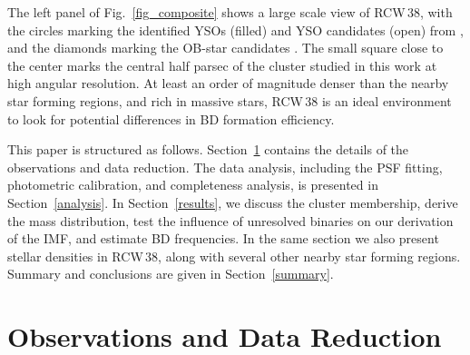 \documentclass[a4paper,fleqn,usenatbib]{mnras}
\begin{document}
 
The left panel of Fig.~\ref{fig_composite} shows a large scale view of RCW\,38, with the circles marking the identified YSOs (filled) 
and YSO candidates (open) from \citet{winston11}, and the diamonds marking the OB-star candidates \citep{wolk06, winston11}. The small
square close to the center marks the central half parsec of the cluster studied in this work at high angular resolution. 
At least an order of magnitude denser than the nearby star forming regions, and rich in massive stars, 
RCW\,38 is an ideal environment to look for potential differences in BD formation efficiency.

This paper is structured as follows. Section~\ref{Obs&DR} contains the details of the observations and data reduction.
The data analysis, including the PSF fitting, photometric calibration, and completeness analysis, is presented in Section~\ref{analysis}. 
In Section~\ref{results}, we discuss the cluster membership, derive the mass distribution, 
test the influence of unresolved binaries on our derivation of the IMF, 
and estimate BD frequencies. In the same section we also present stellar densities in RCW\,38, along with several other nearby star forming regions.
Summary and conclusions are given in Section~\ref{summary}.

\begin{figure*}
\centering
{}
\caption{{\bf Left:} Large scale view of RCW\,38. Circles mark the identified YSOs (filled) and YSO candidates (open) 
from \citet{winston11}, and the diamonds mark OB star candidates \citep{wolk06, winston11}. The field covered by the NACO data 
is shown close to the center of the plot. {\bf Right:} Colour-composite image of the central part of RCW\,38, from the NACO
images in J (blue; 2003 dataset), H (green; 2013 dataset), and Ks-band (red; 2013 dataset).
The brightest star in the center of the image is the binary IRS2; the frame
size is $\sim53\times51$\,arcsec$^2$.
}
\label{fig_composite}
\end{figure*}


\section{Observations and Data Reduction}
\label{Obs&DR}
\end{document}
